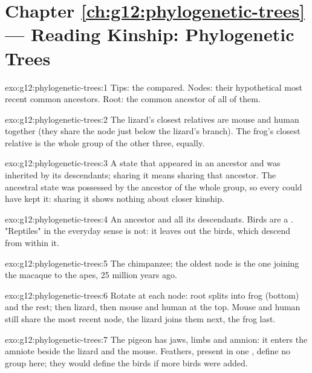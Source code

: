 \section*{Chapter \ref{ch:g12:phylogenetic-trees} --- Reading Kinship: Phylogenetic Trees}

\begin{solution}{exo:g12:phylogenetic-trees:1}
Tips: the  compared. Nodes: their hypothetical most recent
common ancestors. Root: the common ancestor of all of them.
\end{solution}

\begin{solution}{exo:g12:phylogenetic-trees:2}
The lizard's closest relatives are mouse and human together (they
share the node just below the lizard's branch). The frog's closest
relative is the whole group of the other three, equally.
\end{solution}

\begin{solution}{exo:g12:phylogenetic-trees:3}
A state that appeared in an ancestor and was inherited by its
descendants; sharing it means sharing that ancestor. The ancestral
state was possessed by the ancestor of the whole group, so every
 could have kept it: sharing it shows nothing about closer
kinship.
\end{solution}

\begin{solution}{exo:g12:phylogenetic-trees:4}
An ancestor and all its descendants. Birds are a . "Reptiles" in
the everyday sense is not: it leaves out the birds, which descend from
within it.
\end{solution}

\begin{solution}{exo:g12:phylogenetic-trees:5}
The chimpanzee; the oldest node is the one joining the macaque to the
apes, 25 million years ago.
\end{solution}

\begin{solution}{exo:g12:phylogenetic-trees:6}
Rotate at each node: root splits into frog (bottom) and the rest;
then lizard, then mouse and human at the top. Mouse and human still
share the most recent node, the lizard joins them next, the frog
last.
\end{solution}

\begin{solution}{exo:g12:phylogenetic-trees:7}
The pigeon has jaws, limbs and amnion: it enters the amniote 
beside the lizard and the mouse. Feathers, present in one ,
define no group here; they would define the birds if more birds were
added.
\end{solution}

